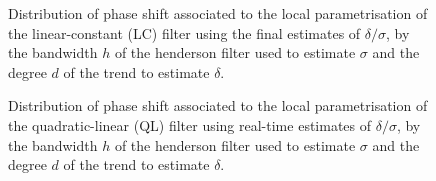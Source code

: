 \documentclass[
]{article}
\newcommand\1{\mathds{1}}
\begin{document}
\begin{figure}

\caption{\label{fig-graphs-lc-deg}Distribution of phase shift associated
to the local parametrisation of the linear-constant (LC) filter using
the final estimates of \(\delta/\sigma\), by the bandwidth \(h\) of the
henderson filter used to estimate \(\sigma\) and the degree \(d\) of the
trend to estimate \(\delta\).}


\end{figure}%

\begin{figure}

\caption{\label{fig-graphs-ql-deg-final}Distribution of phase shift
associated to the local parametrisation of the quadratic-linear (QL)
filter using real-time estimates of \(\delta/\sigma\), by the bandwidth
\(h\) of the henderson filter used to estimate \(\sigma\) and the degree
\(d\) of the trend to estimate \(\delta\).}


\end{figure}%
\end{document}
